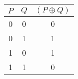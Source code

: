 \begin{tabular}{|c|c||c|}
\hline
$ P $ & $ Q $ & $ (P \oplus Q) $ \\
\hline
0 & 0 & 0 \\
0 & 1 & 1 \\
1 & 0 & 1 \\
1 & 1 & 0 \\
\hline
\end{tabular}
\label{table:tt1}
